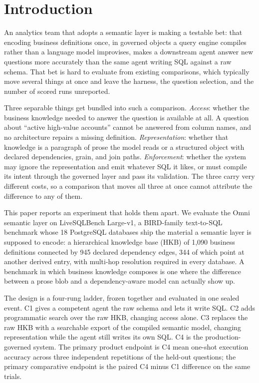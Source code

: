 \section{Introduction}

An analytics team that adopts a semantic layer is making a testable bet: that
encoding business definitions once, in governed objects a query engine compiles
rather than a language model improvises, makes a downstream agent answer new
questions more accurately than the same agent writing SQL against a raw schema.
That bet is hard to evaluate from existing comparisons, which typically move
several things at once and leave the harness, the question selection, and the
number of scored runs unreported.

Three separable things get bundled into such a comparison. \emph{Access}: whether
the business knowledge needed to answer the question is available at all. A
question about ``active high-value accounts'' cannot be answered from column
names, and no architecture repairs a missing definition. \emph{Representation}:
whether that knowledge is a paragraph of prose the model reads or a structured
object with declared dependencies, grain, and join paths. \emph{Enforcement}:
whether the system may ignore the representation and emit whatever SQL it likes,
or must compile its intent through the governed layer and pass its validation.
The three carry very different costs, so a comparison that moves all three at
once cannot attribute the difference to any of them.

This paper reports an experiment that holds them apart. We evaluate the Omni
semantic layer on LiveSQLBench Large-v1, a BIRD-family text-to-SQL benchmark
whose 18 PostgreSQL databases ship the material a semantic layer is supposed to
encode: a hierarchical knowledge base (HKB) of 1,090 business definitions
connected by 945 declared dependency edges, 344 of which point at another derived
entry, with multi-hop resolution required in every database. A benchmark in which
business knowledge composes is one where the difference between a prose blob and
a dependency-aware model can actually show up.

The design is a four-rung ladder, frozen together and evaluated in one sealed
event. C1 gives a competent agent the raw schema and lets it write SQL. C2 adds
programmatic search over the raw HKB, changing access alone. C3 replaces the raw
HKB with a searchable export of the compiled semantic model, changing
representation while the agent still writes its own SQL. C4 is the
production-governed system. The primary product endpoint is C4 mean one-shot
execution accuracy across three independent repetitions of the held-out
questions; the primary comparative endpoint is the paired C4 minus C1 difference
on the same trials.

